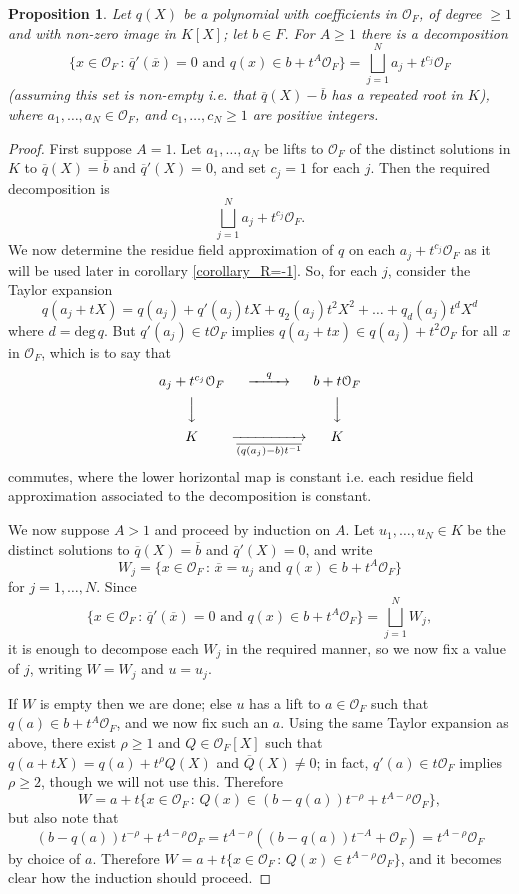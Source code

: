 \documentclass{lmsMODIFIED}
\newtheorem{proposition}[theorem]{Proposition}
\newcommand{\roi}{\mathcal{O}}
\newcommand{\res}[1]{\overline{#1}}
\begin{document}
\begin{proposition}\label{proposition_singular_decomposition}
Let $q(X)$ be a polynomial with coefficients in $\roi_{F}$, of degree $\ge1$ and with non-zero image in $ K [X]$; let $b\in F$. For $A\ge 1$ there is a decomposition \[\{x\in\roi_{F}\,:\,\res{q}'(\res{x})= 0\mbox{ and }q(x)\in b+t^A\roi_{F}\}=\bigsqcup_{j=1}^N a_j+t^{c_j}\roi_{F}\] (assuming this set is non-empty i.e. that $\res{q}(X)-\res{b}$ has a repeated root in $K$), where $a_1,\dots,a_N\in\roi_{F}$, and $c_1,\dots,c_N\ge 1$ are positive integers.
\end{proposition}
\begin{proof}
First suppose $A=1$. Let $a_1,\dots,a_N$ be lifts to $\roi_{F}$ of the distinct solutions in $K$ to $\res{q}(X)=\res{b}$ and $\res{q}'(X)=0$, and set $c_j=1$ for each $j$. Then the required decomposition is \[\bigsqcup_{j=1}^N a_j+t^{c_j}\roi_{F}.\] We now determine the residue field approximation of $q$ on each $a_j+t^{c_j}\roi_{F}$ as it will be used later in corollary \ref{corollary_R=-1}. So, for each $j$, consider the Taylor expansion \[q(a_j+tX)=q(a_j)+q'(a_j)tX+q_2(a_j)t^2X^2+\dots+q_d(a_j)t^dX^d\] where $d=\mbox{deg}\,q$. But $q'(a_j)\in t\roi_{F}$ implies $q(a_j+tx)\in q(a_j)+t^2\roi_{F}$ for all $x$ in $\roi_{F}$, which is to say that
\[\begin{CD}
a_j+t^{c_j}\roi_{F} @>q>> b+t\roi_{F} \\
@VVV  @VVV  \\
 K  @>>\res{(q(a_j)-b)t^{-1}}>  K \\
\end{CD}\]
commutes, where the lower horizontal map is constant i.e. each residue field approximation associated to the decomposition is constant.

We now suppose $A>1$ and proceed by induction on $A$. Let $u_1,\dots,u_N\in K $ be the distinct solutions to $\res{q}(X)=\res{b}$ and $\res{q}'(X)=0$, and write \[W_j=\{x\in\roi_{F}\,:\,\res{x}=u_j\mbox{ and }q(x)\in b+t^A\roi_{F}\}\] for $j=1,\dots,N$. Since \[\{x\in\roi_{F}\,:\,\res{q}'(\res{x})= 0\mbox{ and }q(x)\in b+t^A\roi_{F}\}=\bigsqcup_{j=1}^N W_j,\] it is enough to decompose each $W_j$ in the required manner, so we now fix a value of $j$, writing $W=W_j$ and $u=u_j$. 

If $W$ is empty then we are done; else $u$ has a lift to $a\in\roi_{F}$ such that $q(a)\in b+t^A\roi_{F}$, and we now fix such an $a$. Using the same Taylor expansion as above, there exist $\rho\ge1$ and $Q\in \roi_{F}[X]$ such that $q(a+tX)=q(a)+t^{\rho}Q(X)$ and $\res{Q}(X)\neq0$; in fact, $q'(a)\in t\roi_{F}$ implies $\rho\ge2$, though we will not use this. Therefore \[W=a+t\{x\in\roi_{F}\,:\,Q(x)\in(b-q(a))t^{-\rho}+t^{A-\rho}\roi_{F}\},\] but also note that \[(b-q(a))t^{-\rho}+t^{A-\rho}\roi_{F}=t^{A-\rho}((b-q(a))t^{-A}+\roi_{F})=t^{A-\rho}\roi_{F}\] by choice of $a$. Therefore $W=a+t\{x\in\roi_{F}\,:\,Q(x)\in t^{A-\rho}\roi_{F}\}$, and it becomes clear how the induction should proceed.


\end{proof}
\end{document}
